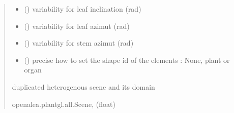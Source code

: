 \documentclass[letterpaper,10pt,english]{sphinxmanual}
\begin{document}
\begin{fulllineitems}
\begin{quote}
\begin{description}
\begin{itemize}
\item {} 
\sphinxAtStartPar
{} () \textendash{} variability for leaf inclination (rad)

\item {} 
\sphinxAtStartPar
{} () \textendash{} variability for leaf azimut (rad)

\item {} 
\sphinxAtStartPar
{} () \textendash{} variability for stem azimut (rad)

\item {} 
\sphinxAtStartPar
{} () \textendash{} precise how to set the shape id of the elements : None, plant or organ

\end{itemize}

\sphinxAtStartPar
duplicated heterogenous scene and its domain

\sphinxAtStartPar
openalea.plantgl.all.Scene, (float)

\end{description}\end{quote}

\end{fulllineitems}

\end{document}
